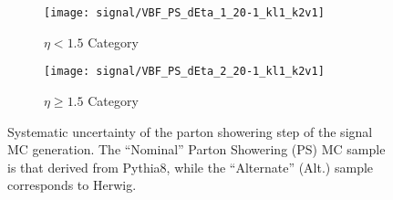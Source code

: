     \begin{figure}
        \centering
        \begin{subfigure}{0.48\textwidth} 
            \texttt{[image: signal/VBF\_PS\_dEta\_1\_20-1\_kl1\_k2v1]}
            \caption{$\eta < 1.5$ Category}
        \end{subfigure}
        \begin{subfigure}{0.48\textwidth}
            \texttt{[image: signal/VBF\_PS\_dEta\_2\_20-1\_kl1\_k2v1]}
            \caption{$\eta \geq 1.5$ Category}
        \end{subfigure}
        \caption{
            Systematic uncertainty of the parton showering step of the signal MC generation.
            The ``Nominal'' Parton Showering (PS) MC sample is that derived from Pythia8,
                while the ``Alternate'' (Alt.) sample corresponds to Herwig.
        }
        \label{fig:sig_syst}
    \end{figure}

    


%
